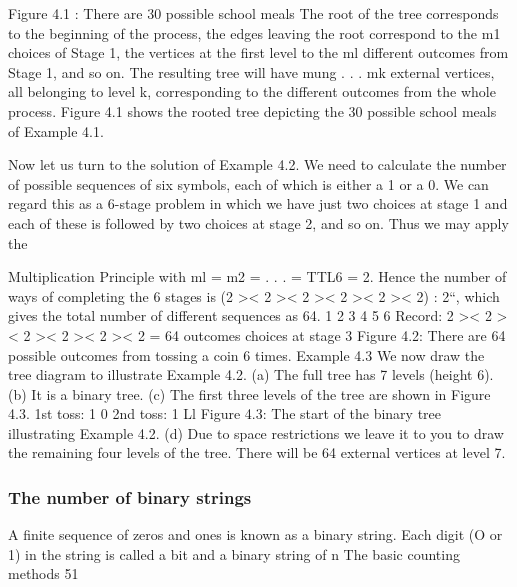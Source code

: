 \documentclass{beamer}
\begin{document}
\begin{frame}
\begin{frame}
Figure 4.1 : There are 30 possible school meals
The root of the tree corresponds to the beginning of the process, the
edges leaving the root correspond to the m1 choices of Stage 1, the
vertices at the ﬁrst level to the ml different outcomes from Stage 1,
and so on. The resulting tree will have mung . . . mk external
vertices, all belonging to level k, corresponding to the different
outcomes from the whole process. Figure 4.1 shows the rooted tree
depicting the 30 possible school meals of Example 4.1.
\end{frame}
\begin{frame}

Now let us turn to the solution of Example 4.2. We need to calculate
the number of possible sequences of six symbols, each of which is
either a 1 or a 0. We can regard this as a 6-stage problem in which
we have just two choices at stage 1 and each of these is followed by
two choices at stage 2, and so on. Thus we may apply the
\end{frame}
\begin{frame}
Multiplication Principle with ml = m2 = . . . = TTL6 = 2.
Hence the number of ways of completing the 6 stages is
(2 >< 2 >< 2 >< 2 >< 2 >< 2) : 2“, which gives the total number of
different sequences as 64.
1 2 3 4 5 6
Record: 2 >< 2 >< 2 >< 2 >< 2 >< 2 = 64 outcomes
choices at stage 3
Figure 4.2: There are 64 possible outcomes from tossing a coin 6 times.
Example 4.3 We now draw the tree diagram to illustrate Example 4.2.
(a) The full tree has 7 levels (height 6).
(b) It is a binary tree.
(c) The ﬁrst three levels of the tree are shown in Figure 4.3.
1st toss: 1 0
2nd toss: 1 Ll
Figure 4.3: The start of the binary tree illustrating Example 4.2.
(d) Due to space restrictions we leave it to you to draw the
remaining four levels of the tree. There will be 64 external
vertices at level 7.
\end{frame}
\begin{frame}
\frametitle{The number of binary strings}
A ﬁnite sequence of zeros and ones is known as a binary string.
Each digit (O or 1) in the string is called a bit and a binary string of n
The basic counting methods
51




\end{frame}
\end{frame}
\end{document}
